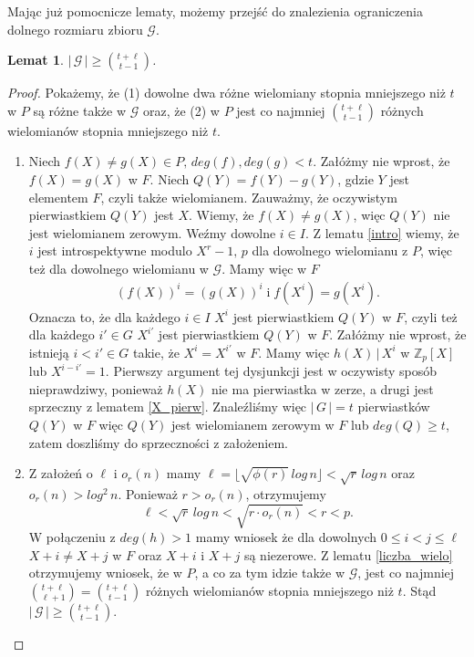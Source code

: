 \documentclass[polish,declaration,shortabstract]{iithesis}
\theoremstyle{definition}
\theoremstyle{remark} \newtheorem{observation}{Obserwacja}
\theoremstyle{plain} \newtheorem{theorem}{Twierdzenie}
\theoremstyle{plain} \newtheorem{lemma}{Lemat}
\theoremstyle{remark} \newtheorem*{remark*}{Uwaga}
\theoremstyle{reminder} \newtheorem*{reminder*}{Przypomnienie}
\begin{document}
Mając już pomocnicze lematy, możemy przejść do znalezienia ograniczenia dolnego rozmiaru zbioru $\mathcal{G}$.
	
\begin{lemma} \label{lower}
	$| \, \mathcal{G} \,| \geq {t + \ell \choose t - 1}$.
\end{lemma}
	
\begin{proof}
	Pokażemy, że (1) dowolne dwa różne wielomiany stopnia mniejszego niż $t$ w $P$ są różne także w $\mathcal{G}$ oraz, że (2) w $P$ jest co najmniej  ${t + \ell \choose t - 1}$ różnych wielomianów stopnia mniejszego niż $t$. 
	\begin{enumerate}[label=(\arabic*),leftmargin=.4in]
		\item Niech $f(X) \neq g(X) \in P, \, deg(f), deg(g) < t$. Załóżmy nie wprost, że $f(X) = g(X)$ w $F$. 
		      Niech $Q(Y) = f(Y) - g(Y)$, gdzie $Y$ jest elementem $F$, czyli także wielomianem. Zauważmy, że oczywistym pierwiastkiem $Q(Y)$ jest $X$. Wiemy, że $f(X) \neq g(X)$, więc $Q(Y)$ nie jest wielomianem zerowym. Weźmy dowolne $i \in I$. Z lematu \ref{intro} wiemy, że $i$ jest introspektywne modulo $X^r - 1, \, p$ dla dowolnego wielomianu z $P$, więc też dla dowolnego wielomianu w $\mathcal{G}$. Mamy więc w $F$
		      \begin{align*}
		      	(f(X))^i = (g(X))^i \; \text{i} \; f(X^i) = g(X^i). 
		      \end{align*}
		      Oznacza to, że dla każdego $i \in I$ $X^i$ jest pierwiastkiem $Q(Y)$ w $F$, czyli też dla każdego $i' \in G$ $X^{i'}$ jest pierwiastkiem $Q(Y)$ w $F$. Załóżmy nie wprost, że istnieją $i < i' \in G$ takie, że $X^i = X^{i'}$ w $F$. Mamy więc $h(X) \, | \, X^i$ w $\mathbb{Z}_p[X]$ lub $X^{i - i'} = 1$. Pierwszy argument tej dysjunkcji jest w oczywisty sposób nieprawdziwy, ponieważ $h(X)$ nie ma pierwiastka w zerze, a drugi jest sprzeczny z lematem \ref{X_pierw}.
		      Znaleźliśmy więc $|\,G\,| = t$ pierwiastków $Q(Y)$ w $F$ więc $Q(Y)$ jest wielomianem zerowym w $F$ lub $deg(Q) \geq t$, zatem doszliśmy do sprzeczności z założeniem.
		\item Z założeń o $\ell$ i $o_r(n)$ mamy $\ell = \lfloor \sqrt{\phi(r)} \, log\, n \rfloor < \sqrt{r} \, log \, n $ oraz $o_r(n) > log^2 \, n$. Ponieważ $r > o_r(n)$, otrzymujemy \[\ell < \sqrt{r} \, log \, n < \sqrt{r \cdot o_r(n)} < r < p.\] W połączeniu z $deg(h) > 1$ mamy wniosek że dla dowolnych $0 \leq i < j \leq \ell$ $X + i \neq X + j$ w $F$ oraz $X + i$ i $X + j$ są niezerowe. 
		      \newline Z lematu \ref{liczba_wielo} otrzymujemy wniosek, że w $P$, a co za tym idzie także w $\mathcal{G}$, jest co najmniej ${t + \ell \choose \ell + 1} = {t + \ell \choose t - 1}$ różnych wielomianów stopnia mniejszego niż $t$. Stąd $| \, \mathcal{G} \, | \geq {t + \ell \choose t - 1}$.
	\end{enumerate}
\end{proof}
    
\end{document}
